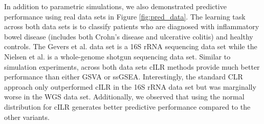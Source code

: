 \documentclass{article}
\begin{document}

In addition to parametric simulations, we also demonstrated predictive performance using real data sets in Figure \ref{fig:pred_data}. The learning task across both data sets is to classify patients who are diagnosed with inflammatory bowel disease (includes both Crohn's disease and ulcerative colitis) and healthy controls. The Gevers et al. \cite{gevers2014} data set is a 16S rRNA sequencing data set while the Nielsen et al. \cite{nielsen2014} is a whole-genome shotgun sequencing data set. Similar to simulation experiments, across both data sets cILR methods provide much better performance than either GSVA or ssGSEA. Interestingly, the standard CLR approach only outperformed cILR in the 16S rRNA data set but was marginally worse in the WGS data set. Additionally, we observed that using the normal distribution for cILR generates better predictive performance compared to the other variants.
\end{document}
